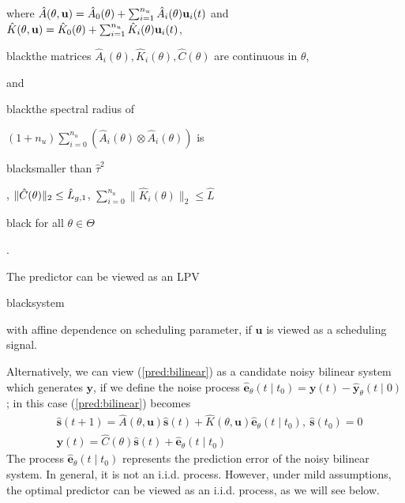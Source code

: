 \documentclass{ifacconf}
\def\eqref#1{(\ref{#1})}
\def\rve{{\mathbf{e}}}
\def\rvu{{\mathbf{i}}}
\def\rvs{{\mathbf{s}}}
\def\rvu{{\mathbf{u}}}
\def\rvy{{\mathbf{y}}}
\begin{document}
where $\hat{A}(\theta,\rvu)=\hat{A}_{0}(\theta)+\sum_{i=1}^{n_u} \hat{A}_{i}(\theta){\color{black}\rvu_i(t)}$ and $\hat{K}(\theta,\rvu)=\hat{K}_{0}(\theta)+\sum_{i=1}^{n_u} \hat{K}_{i}(\theta){\color{black}\rvu_i(t)}$, \begin{color}{black}the matrices $\hat{A}_i(\theta),\hat{K}_i(\theta),\hat{C}(\theta)$ are continuous in $\theta$,\end{color} and 
\begin{color}{black}the spectral radius of \end{color}$(1+n_u)\sum_{i=0}^{n_u} (\hat{A}_{i}(\theta) \otimes \hat{A}_{i}(\theta))$ is \begin{color}{black}smaller than $\hat{\tau}^2$\end{color},
$\|{\color{black}\hat{C}(\theta)}\|_2 \le \hat{L}_{g,1}$, $\sum_{i=0}^{n_u}\|\hat{K}_{i}(\theta)\|_2 \le \hat{L}$ \begin{color}{black} for all $\theta \in \Theta$\end{color}.

The predictor can be viewed as an LPV \begin{color}{black}system\end{color} with affine dependence on scheduling parameter, if $\rvu$ is viewed as a scheduling signal.

Alternatively, we can view \eqref{pred:bilinear} as a candidate noisy bilinear system which generates $\rvy$, if we define
the noise process $\hat{\rve}_{\theta}(t \mid t_0)=\rvy(t)-\hat{\rvy}_{\theta}(t\mid 0)$; in this case \eqref{pred:bilinear} becomes
\begin{equation}
\label{pred:bilinear:gen}
\begin{aligned}
  & \hat{\rvs}(t+1)= \hat{A}(\theta, \rvu)\hat{\rvs}(t)+ \hat{K}(\theta,\rvu)\hat{\rve}_{\theta}(t \mid t_0), ~ \hat{\rvs}(t_0) = 0\\
& \rvy(t) = \hat{C}(\theta)\hat{\rvs}(t)+\hat{\rve}_{\theta }(t \mid t_0)
\end{aligned}
\end{equation}
The process $\hat{\rve}_{\theta}(t \mid t_0)$ represents the prediction error of the noisy bilinear system. In general, it is not an i.i.d. process. However, under mild assumptions, the optimal predictor can be viewed as an i.i.d. process, as we will see below. 
\end{document}
